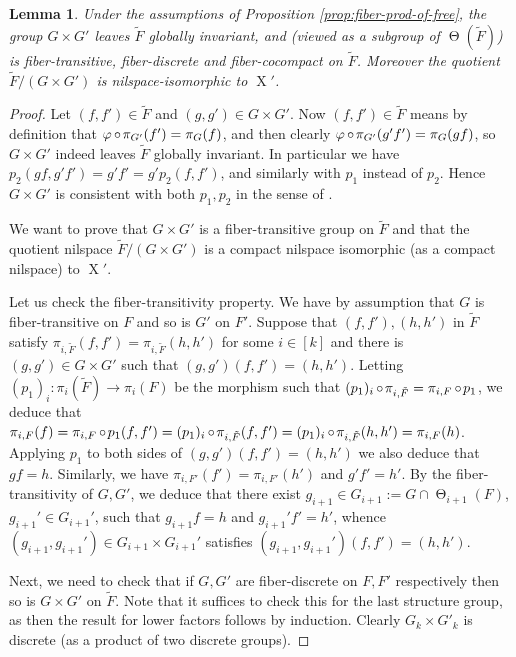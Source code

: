 \documentclass[a4paper,12pt,reqno]{amsart}
\newtheorem{lemma}[theorem]{Lemma}
\theoremstyle{definition}
\def\to{\rightarrow}
\DeclareMathOperator{\tran}{\Theta}
\DeclareMathOperator{\ns}{X}
\DeclareMathOperator{\co}{\circ\hspace{-0.02 cm}}
\begin{document}
\begin{lemma}\label{lem:structure-of-fiber-prod-of-free}
Under the assumptions of Proposition \ref{prop:fiber-prod-of-free}, the group $G\times G'$ leaves $\tilde{F}$ globally invariant, and \textup{(}viewed as a subgroup of $\tran(\tilde{F})$\textup{)} is fiber-transitive, fiber-discrete and fiber-cocompact on $\tilde{F}$. Moreover the quotient $\tilde{F}/(G\times G')$ is nilspace-isomorphic to $\ns'$.  
\end{lemma}

\begin{proof}
Let $(f,f')\in \tilde{F}$ and $(g,g')\in G\times G'$. Now $(f,f')\in \tilde{F}$ means by definition that $\varphi\co\pi_{G'}(f')=\pi_G(f)$, and then clearly $\varphi\co\pi_{G'}(g'f')=\pi_G(gf)$, so $G\times G'$ indeed leaves $\tilde{F}$ globally invariant. In particular we have 
$p_2(gf,g'f')=g'f'=g'p_2(f,f')$, and similarly with $p_1$ instead of $p_2$. Hence $G\times G'$ is consistent with both $p_1,p_2$ in the sense of \cite[Definition 1.2]{CGSS}.

We want to prove that $G\times G'$ is a fiber-transitive group on $\tilde{F}$ and that the quotient nilspace $\tilde{F}/(G\times G')$ is a compact nilspace isomorphic (as a compact nilspace) to $\ns'$.

Let us check the fiber-transitivity property. We have by assumption that $G$ is fiber-transitive on $F$ and so is $G'$ on $F'$. Suppose that $(f,f'), (h,h')$ in $\tilde{F}$ satisfy $\pi_{i,\tilde{F}} (f,f') = \pi_{i,\tilde{F}}(h,h')$ for some $i\in[k]$ and there is $(g,g')\in G\times G'$ such that $(g,g')(f,f')=(h,h')$. Letting $(p_1)_i:\pi_i(\tilde{F})\to \pi_i(F)$ be the morphism such that $(p_1)_i\co \pi_{i,\tilde{F}} = \pi_{i,F}\co p_1$, we deduce that $\pi_{i,F}(f)=\pi_{i,F}\co p_1(f,f') = (p_1)_i\co \pi_{i,\tilde{F}}(f,f') = (p_1)_i\co \pi_{i,\tilde{F}}(h,h') = \pi_{i,F}(h)$. Applying $p_1$ to both sides of $(g,g')(f,f')=(h,h')$ we also deduce that $gf = h$. Similarly, we have $\pi_{i,F'}(f')=\pi_{i,F'}(h')$ and $g' f'= h'$. By the fiber-transitivity of $G,G'$, we deduce that there exist $g_{i+1}\in G_{i+1}:=G\cap \tran_{i+1}(F)$, $g_{i+1}'\in G_{i+1}'$, such that $g_{i+1}f=h$ and $g_{i+1}'f'=h'$, whence $(g_{i+1},g_{i+1}')\in G_{i+1}\times G_{i+1}'$ satisfies $(g_{i+1},g_{i+1}')(f,f')=(h,h')$.

Next, we need to check that if $G,G'$ are fiber-discrete on $F,F'$ respectively then so is $G\times G'$ on $\tilde{F}$. Note that it suffices to check this for the last structure group, as then the result for lower factors follows by induction. Clearly $G_{k}\times G'_k$ is discrete (as a product of two discrete groups). 


\end{proof}
\end{document}
